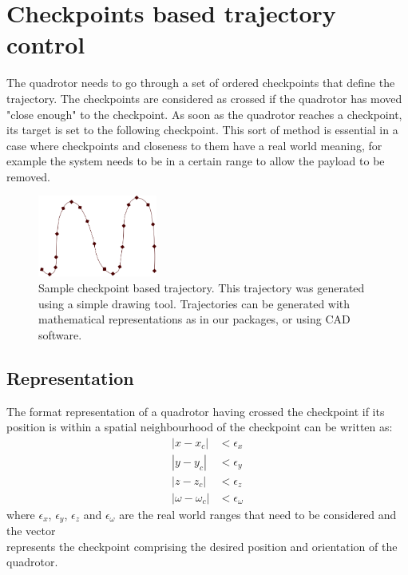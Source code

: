 \documentclass[hidelinks,BTech]{iitmdiss}
\begin{document}
\section{Checkpoints based trajectory control}
The quadrotor needs to go through a set of ordered checkpoints that define the trajectory. The checkpoints are considered as crossed if the quadrotor has moved "close enough" to the checkpoint. As soon as the quadrotor reaches a checkpoint, its target is set to the following checkpoint. This sort of method is essential in a case where checkpoints and closeness to them have a real world meaning, for example the system needs to be in a certain range to allow the payload to be removed.

\begin{figure}[H]
  \centering
    \includegraphics[width=0.35\textwidth]{trajectory.png}
    \caption{Sample checkpoint based trajectory. This trajectory was generated using a simple drawing tool. Trajectories can be generated with mathematical representations as in our packages, or using CAD software.}
\end{figure}

\subsection*{Representation}
The format representation of a quadrotor having crossed the checkpoint if its position is within a spatial neighbourhood of the checkpoint can be written as:
\begin{equation} \begin{split}
  |x - x_c| &< \epsilon_x \\
  |y - y_c| &< \epsilon_y \\
  |z - z_c| &< \epsilon_z \\
  |\omega - \omega_c| &< \epsilon_\omega
\end{split} \end{equation}
where $\epsilon_x$, $\epsilon_y$, $\epsilon_z$ and $\epsilon_\omega$ are the real world ranges that need to be considered and the vector
\begin{equation}
  [x_c, y_c, z_y, \omega_c]
\end{equation}
represents the checkpoint comprising the desired position and orientation of the quadrotor.
\end{document}
